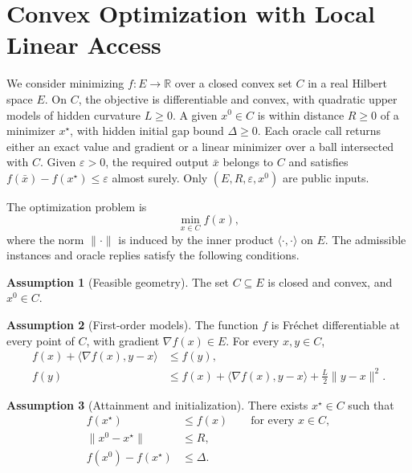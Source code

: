 \documentclass[10pt]{article}
\theoremstyle{definition}
\newtheorem{assumption}{Assumption}
\begin{document}
\section*{Convex Optimization with Local Linear Access}
We consider minimizing $f:E\to\mathbb{R}$ over a closed convex set $C$ in a real Hilbert space $E$. On $C$, the objective is differentiable and convex, with quadratic upper models of hidden curvature $L\geq0$. A given $x^0\in C$ is within distance $R\geq0$ of a minimizer $x^\star$, with hidden initial gap bound $\Delta\geq0$. Each oracle call returns either an exact value and gradient or a linear minimizer over a ball intersected with $C$. Given $\varepsilon>0$, the required output $\bar{x}$ belongs to $C$ and satisfies $f(\bar{x})-f(x^\star)\leq\varepsilon$ almost surely. Only $(E,R,\varepsilon,x^0)$ are public inputs.

The optimization problem is
\[
\min_{x\in C} f(x),
\]
where the norm $\|\cdot\|$ is induced by the inner product $\langle\cdot,\cdot\rangle$ on $E$. The admissible instances and oracle replies satisfy the following conditions.

\begin{assumption}[Feasible geometry]
The set $C\subseteq E$ is closed and convex, and $x^0\in C$.
\end{assumption}

\begin{assumption}[First-order models]
The function $f$ is Fr\'echet differentiable at every point of $C$, with gradient $\nabla f(x)\in E$. For every $x,y\in C$,
\[
\begin{aligned}
f(x)+\langle\nabla f(x),y-x\rangle &\leq f(y),\\
f(y) &\leq f(x)+\langle\nabla f(x),y-x\rangle
       +\frac{L}{2}\|y-x\|^2.
\end{aligned}
\]
\end{assumption}

\begin{assumption}[Attainment and initialization]
There exists $x^\star\in C$ such that
\[
\begin{aligned}
f(x^\star) &\leq f(x) \qquad \text{for every }x\in C,\\
\|x^0-x^\star\| &\leq R,\\
f(x^0)-f(x^\star) &\leq\Delta.
\end{aligned}
\]
\end{assumption}
\end{document}
